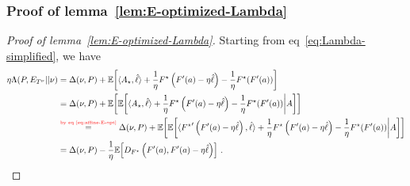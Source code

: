 \documentclass{article}
\theoremstyle{plain}
\theoremstyle{definition}
\newcommand{\E}{\mathbb E}
\newcommand{\abovelabel}[1]{\stackrel{\raisebox{0.5mm}{\textrm{\tiny \color{red} #1}}}}
\newcommand{\hl}{\hat{\ell}\xspace}
\begin{document}
\subsubsection{Proof of lemma~\ref{lem:E-optimized-Lambda}}
\label{proof:lem:E-optimized-Lambda}
\begin{proof}[Proof of lemma~\ref{lem:E-optimized-Lambda}]
    Starting from eq~\ref{eq:Lambda-simplified}, we have
    \begin{align*}
        \eta \Lambda(P, E_{T^\nu} || \nu)
         & =
        \Delta(\nu, P) +
        \E\!\left[
            \langle A_\star, \hl \rangle
            + \frac{1}{\eta} F^\star\left(F'(a) - \eta \hl\right)
            - \frac{1}{\eta} F^\star(F'(a))
            \right]
        \\
         & =
        \Delta(\nu, P) +
        \E\!\left[
            \E\!\left[
                \langle A_\star, \hl \rangle
                + \frac{1}{\eta} F^\star\left(F'(a) - \eta \hl\right)
                - \frac{1}{\eta} F^\star(F'(a))
                \bigg|
                A
                \right]
            \right]
        \\
         &
        \abovelabel{by eq~\ref{eq:affine-E-opt}}
        =
        \Delta(\nu, P) +
        \E\!\left[
            \E\!\left[
                \langle {F^\star}'\left(F'(a) - \eta \hl\right), \hl \rangle
                + \frac{1}{\eta} F^\star\left(F'(a) - \eta \hl\right)
                - \frac{1}{\eta} F^\star(F'(a))
                \bigg|
                A
                \right]
            \right]
        \\
         & =
        \Delta(\nu, P) -
        \frac{1}{\eta}
        \E\!\left[
            D_{F^\star}\left(F'(a), F'(a) - \eta \hl\right)
            \right]\,.
    \end{align*}
\end{proof}
\end{document}
